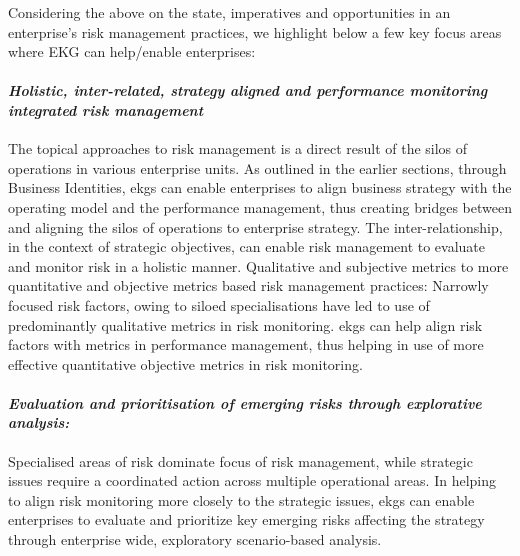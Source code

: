%
%
Considering the above on the state, imperatives and opportunities in an enterprise’s risk management practices,
we highlight below a few key focus areas where EKG can help/enable enterprises:

\paragraph*{\textit{Holistic, inter-related, strategy aligned and performance monitoring integrated risk management}}

The topical approaches to risk management is a direct result of the silos of operations in various enterprise units.
As outlined in the earlier sections, through Business Identities,
\glspl{ekg} can enable enterprises to align business strategy with the operating model and the performance management,
thus creating bridges between and aligning the silos of operations to enterprise strategy.
The inter-relationship, in the context of strategic objectives,
can enable risk management to evaluate and monitor risk in a holistic manner.
Qualitative and subjective metrics to more quantitative and objective metrics based risk management practices:
Narrowly focused risk factors, owing to siloed specialisations have led to use of predominantly qualitative metrics
in risk monitoring.
\Glspl{ekg} can help align risk factors with metrics in performance management,
thus helping in use of more effective quantitative objective metrics in risk monitoring.

\paragraph*{\textit{Evaluation and prioritisation of emerging risks through explorative analysis:}}

Specialised areas of risk dominate focus of risk management, while strategic issues require a coordinated action
across multiple operational areas.
In helping to align risk monitoring more closely to the strategic issues,
\glspl{ekg} can enable enterprises to evaluate and prioritize key emerging risks affecting the strategy
through enterprise wide, exploratory scenario-based analysis.
